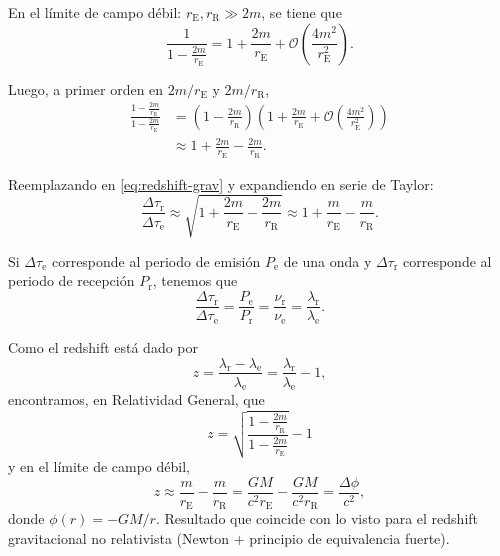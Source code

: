 \documentclass[letterpaper,11pt]{article}
\begin{document}
En el límite de campo débil: $r_{\text{E}}, r_{\text{R}} \gg 2m$, se tiene que
\begin{equation}
\frac{1}{1 - \frac{2m}{r_{\text{E}}}} = 1 + \frac{2m}{r_{\text{E}}} + \mathcal{O}\left(\frac{4m^2}{r_{\text{E}}^2} \right).
\end{equation}

Luego, a primer orden en $2m/r_{\text{E}}$ y $2m/r_{\text{R}}$,
\begin{align}
\frac{1 - \frac{2m}{r_{\text{R}}}}{1 - \frac{2m}{r_{\text{E}}}} &= \left( 1 - \frac{2m}{r_{\text{R}}} \right) \left( 1 + \frac{2m}{r_{\text{E}}} + \mathcal{O}\left(\frac{4m^2}{r_{\text{E}}^2} \right) \right)  \nonumber\\
&\approx 1 + \frac{2m}{r_{\text{E}}} - \frac{2m}{r_{\text{R}}}.
\end{align}

Reemplazando en \eqref{eq:redshift-grav} y expandiendo en serie de Taylor:
\begin{equation}
\frac{\Delta \tau_\text{r}}{\Delta \tau_{\text{e}}} \approx \sqrt{1 + \frac{2m}{r_{\text{E}}} - \frac{2m}{r_{\text{R}}}} \approx 1 + \frac{m}{r_{\text{E}}} - \frac{m}{r_{\text{R}}}.
\end{equation}

Si $\Delta \tau_{\text{e}}$ corresponde al periodo de emisión $P_{\text{e}}$ de una onda y $\Delta \tau_{\text{r}}$ corresponde al periodo de recepción $P_{\text{r}}$, tenemos que
\begin{equation}
\frac{\Delta \tau_\text{r}}{\Delta \tau_{\text{e}}} = \frac{P_{\text{e}}}{P_{\text{r}}} = \frac{\nu_{\text{r}}}{\nu_{\text{e}}} = \frac{\lambda_{\text{r}}}{\lambda_{\text{e}}}. 
\end{equation}

Como el redshift está dado por
\begin{equation}
z = \frac{\lambda_{\text{r}} - \lambda_{\text{e}}}{\lambda_{\text{e}}} = \frac{\lambda_{\text{r}}}{\lambda_{\text{e}}} - 1,
\end{equation}
encontramos, en Relatividad General, que
\begin{equation}
z = \sqrt{\frac{1 - \frac{2m}{r_{\text{R}}}}{1 - \frac{2m}{r_{\text{E}}}}} - 1
\end{equation}
y en el límite de campo débil,
\begin{equation}
z \approx \frac{m}{r_{\text{E}}} - \frac{m}{r_{\text{R}}} = \frac{GM}{c^2 r_{\text{E}}} - \frac{GM}{c^2 r_{\text{R}}} = \frac{\Delta \phi}{c^2},
\end{equation}
donde $\phi(r) = - GM/r$. Resultado que coincide con lo visto para el redshift gravitacional no relativista (Newton + principio de equivalencia fuerte).
\end{document}
